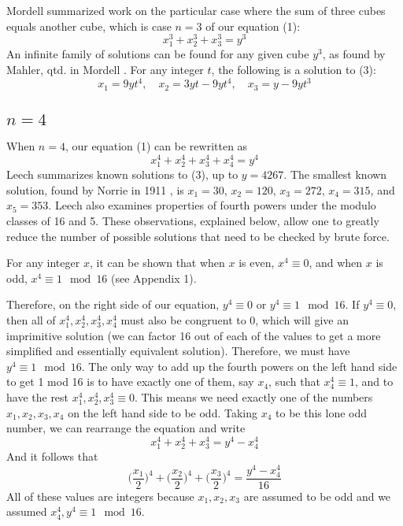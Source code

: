 \documentclass{article}
\newcommand{\q}{\quad}
\begin{document}
\begin{flushleft}
Mordell \cite{mordell} summarized work on the particular case where the sum of three cubes equals another cube, which is case $n=3$ of our equation (1): 
\begin{equation}
    x_1^3 + x_2^3 + x_3^3 = y^3
\end{equation}
An infinite family of solutions can be found for any given cube $y^3$, as found by Mahler, qtd. in Mordell \cite{mordell}. For any integer $t$, the following is a solution to (3):
\begin{equation*}
    x_1 = 9yt^4, \q x_2=3yt-9yt^4, \q x_3 = y-9yt^3
\end{equation*}
\subsection{$n=4$}
When $n=4$, our equation (1) can be rewritten as 
\begin{equation}
    x_1^4+x_2^4+x_3^4+x_4^4=y^4
\end{equation}
Leech \cite{leech} summarizes known solutions to (3), up to $y=4267$. The smallest known solution, found by Norrie in 1911 \cite{leech}, is $x_1=30$, 
$x_2=120$, $x_3=272$, $x_4=315$, and $x_5=353$. Leech also examines properties of fourth powers under the modulo classes of 16 and 5. These observations, explained below, allow one to greatly reduce the number of possible solutions that need to be checked by brute force. \vspace{.1in}

For any integer $x$, it can be shown that when $x$ is even, $x^4 \equiv 0$, and when $x$ is odd, $x^4 \equiv 1 \mod 16$ (see Appendix 1).   \vspace{.1in}

Therefore, on the right side of our equation, $y^4 \equiv 0$ or $y^4 \equiv 1 \mod 16$. If $y^4 \equiv 0$, then all of $x_1^4, x_2^4, x_3^4, x_4^4$ must also be congruent to 0, which will give an imprimitive solution (we can factor 16 out of each of the values to get a more simplified and essentially equivalent solution). Therefore, we must have $y^4 \equiv 1 \mod 16$. The only way to add up the fourth powers on the left hand side to get 1 mod 16 is to have exactly one of them, say $x_4$, such that $x_4^4 \equiv 1$, and to have the rest $x_1^4, x_2^4, x_3^4 \equiv 0$. This means we need exactly one of the numbers $x_1, x_2, x_3, x_4$ on the left hand side to be odd. Taking $x_4$ to be this lone odd number, we can rearrange the equation and write 
\begin{equation*}
    x_1^4+x_2^4+x_3^4=y^4-x_4^4
\end{equation*}
And it follows that 
\begin{equation*}
    \Big(\frac{x_1}{2}\Big)^4 +  \Big(\frac{x_2}{2}\Big)^4 +  \Big(\frac{x_3}{2}\Big)^4 = \frac{y^4-x_4^4}{16}
\end{equation*}
All of these values are integers because $x_1, x_2, x_3$ are assumed to be odd and we assumed $x_4^4, y^4 \equiv 1 \mod 16$. \vspace{.1in}


\end{flushleft}
\end{document}
